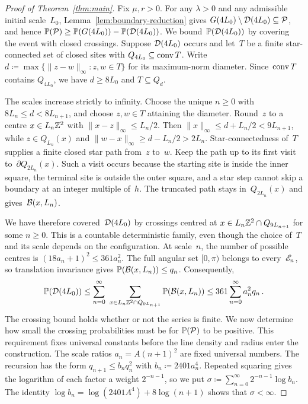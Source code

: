 \documentclass[11pt,letterpaper]{article}
\begin{document}
\begin{proof}[Proof of Theorem~\ref{thm:main}]
Fix $\mu,r>0$. For any $\lambda>0$ and any admissible initial scale~$L_0$, Lemma~\ref{lem:boundary-reduction} gives $G(4L_0)\setminus\mathcal D(4L_0)\subseteq\mathcal P$, and hence $\mathbb P(\mathcal P)\ge\mathbb P(G(4L_0))-\mathbb P(\mathcal D(4L_0))$. We bound~$\mathbb P(\mathcal D(4L_0))$ by covering the event with closed crossings. Suppose $\mathcal D(4L_0)$ occurs and let~$T$ be a finite star-connected set of closed sites with $Q_{4L_0}\subseteq\operatorname{conv} T$. Write $d\coloneqq\max\{\lVert z-w\rVert_\infty\colon z,w\in T\}$ for its maximum-norm diameter. Since~$\operatorname{conv} T$ contains $Q_{4L_0}$, we have $d\ge8L_0$ and $T\subseteq Q_d$. 

The scales increase strictly to infinity. Choose the unique $n\ge0$ with $8L_n\le d<8L_{n+1}$, and choose $z,w\in T$ attaining the diameter. Round~$z$ to a centre $x\in L_n\mathbb Z^2$ with $\lVert x-z\rVert_\infty\le L_n/2$. Then $\lVert x\rVert_\infty\le d+L_n/2<9L_{n+1}$, while $z\in Q_{L_n}(x)$ and $\lVert w-x\rVert_\infty\ge d-L_n/2>2L_n$.
Star-connectedness of~$T$ supplies a finite closed star path from~$z$ to~$w$. Keep the path up to its first visit to~$\partial Q_{2L_n}(x)$. Such a visit occurs because the starting site is inside the inner square, the terminal site is outside the outer square, and a star step cannot skip a boundary at an integer multiple of~$h$. The truncated path stays in~$Q_{2L_n}(x)$ and gives~$\mathcal B(x,L_n)$.

We have therefore covered~$\mathcal D(4L_0)$ by crossings centred at $x\in L_n\mathbb Z^2\cap Q_{9L_{n+1}}$ for some $n\ge0$. This is a countable deterministic family, even though the choice of~$T$ and its scale depends on the configuration. At scale~$n$, the number of possible centres is $(18a_n+1)^2\le361a_n^2$. The full angular set $[0,\pi)$ belongs to every~$\mathscr E_n$, so translation invariance gives $\mathbb P(\mathcal B(x,L_n))\le q_n$. Consequently,
\begin{equation}\label{eq:boundary-crossing-bound}
  \mathbb P(\mathcal D(4L_0))\le\sum_{n=0}^\infty\ \sum_{x\in L_n\mathbb Z^2\cap Q_{9L_{n+1}}}\mathbb P(\mathcal B(x,L_n))\le361\sum_{n=0}^\infty a_n^2q_n\,.
\end{equation}
The crossing bound holds whether or not the series is finite. We now determine how small the crossing probabilities must be for $\mathbb P(\mathcal P)$ to be positive. This requirement fixes universal constants before the line density and radius enter the construction. The scale ratios $a_n=A(n+1)^2$ are fixed universal numbers. The recursion has the form $q_{n+1}\le b_nq_n^2$ with $b_n\coloneqq2401a_n^4$. Repeated squaring gives the logarithm of each factor a weight $2^{-n-1}$, so we put $\sigma\coloneqq\sum_{n=0}^\infty2^{-n-1}\log b_n$. The identity $\log b_n=\log(2401A^4)+8\log(n+1)$ shows that $\sigma<\infty$.


\end{proof}
\end{document}
